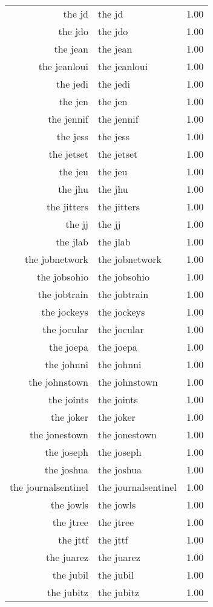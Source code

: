\begin{table}[ht]
\begin{tabular}{rlr}
  the jd & the jd & 1.00 \\ 
  the jdo & the jdo & 1.00 \\ 
  the jean & the jean & 1.00 \\ 
  the jeanloui & the jeanloui & 1.00 \\ 
  the jedi & the jedi & 1.00 \\ 
  the jen & the jen & 1.00 \\ 
  the jennif & the jennif & 1.00 \\ 
  the jess & the jess & 1.00 \\ 
  the jetset & the jetset & 1.00 \\ 
  the jeu & the jeu & 1.00 \\ 
  the jhu & the jhu & 1.00 \\ 
  the jitters & the jitters & 1.00 \\ 
  the jj & the jj & 1.00 \\ 
  the jlab & the jlab & 1.00 \\ 
  the jobnetwork & the jobnetwork & 1.00 \\ 
  the jobsohio & the jobsohio & 1.00 \\ 
  the jobtrain & the jobtrain & 1.00 \\ 
  the jockeys & the jockeys & 1.00 \\ 
  the jocular & the jocular & 1.00 \\ 
  the joepa & the joepa & 1.00 \\ 
  the johnni & the johnni & 1.00 \\ 
  the johnstown & the johnstown & 1.00 \\ 
  the joints & the joints & 1.00 \\ 
  the joker & the joker & 1.00 \\ 
  the jonestown & the jonestown & 1.00 \\ 
  the joseph & the joseph & 1.00 \\ 
  the joshua & the joshua & 1.00 \\ 
  the journalsentinel & the journalsentinel & 1.00 \\ 
  the jowls & the jowls & 1.00 \\ 
  the jtree & the jtree & 1.00 \\ 
  the jttf & the jttf & 1.00 \\ 
  the juarez & the juarez & 1.00 \\ 
  the jubil & the jubil & 1.00 \\ 
  the jubitz & the jubitz & 1.00 \\ 

\end{tabular}
\end{table}
